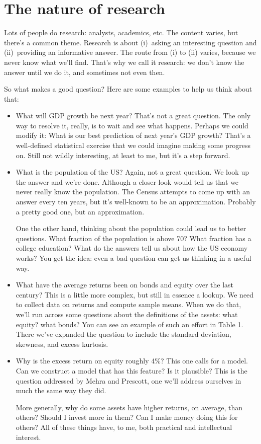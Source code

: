 \documentclass[11pt]{article}
\begin{document}
\section{The nature of research}

Lots of people do research:  analysts, academics, etc.
The content varies, but there's a common theme.
Research is about
(i)~asking an interesting question
and (ii)~providing an informative answer.
The route from (i) to (ii) varies, because we never know
what we'll find.
That's why we call it research:
we don't know the answer until we do it,
and sometimes not even then.

So what makes a good question?
Here are some examples to help us think about that:
%
\begin{itemize}
\item What will GDP growth be next year?
That's not a great question.  The only way to resolve it, really,
is to wait and see what happens.
Perhaps we could modify it:
What is our best prediction of next year's GDP growth?
That's a well-defined statistical exercise that we could
imagine making some progress on.
Still not wildly interesting, at least to me,
but it's a step forward.

\item What is the population of the US?
Again, not a great question.
We look up the answer and we're done.
Although a closer look would tell us that we never really know
the population.
The Census attempts to come up with an answer every ten years,
but it's well-known to be an approximation.
Probably a pretty good one, but an approximation.

One the other hand, thinking about the population could lead us
to better questions.
What fraction of the population is above 70?
What fraction has a college education?
What do the answers tell us about how the US economy works?
You get the idea:  even a bad question can get us thinking in a useful way.

\item What have the average returns been on bonds and equity over the last
century?
This is a little more complex, but still in essence a lookup.
We need to collect data on returns and compute sample means.
When we do that, we'll run across some questions about the definitions
of the assets:  what equity?  what bonds?
You can see an example of such an effort in Table 1.
There we've expanded the question to include the standard deviation,
skewness, and excess kurtosis.

\item Why is the excess return on equity roughly 4\%?
This one calls for a model.
Can we construct a model that has this feature?
Is it plausible?
This is the question addressed by Mehra and Prescott,
one we'll address ourselves in much the same way they did.

More generally, why do some assets have higher returns, on average, than others?
Should I invest more in them?  Can I make money doing this for others?
All of these things have, to me, both practical and intellectual interest.
\end{itemize}
\end{document}
